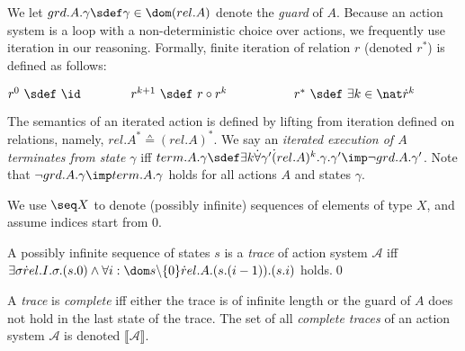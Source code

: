 \documentclass[11pt]{llncs}
\def \endbox{\hfill \qed}
\def \bs{\backslash}
\newcommand{\beh}[1]{\llbracket #1 \rrbracket}
\def \all  {\forall}
\newcommand{\msA}{\mathscr{A}}
\begin{document}
We let $grd.A.\gamma \sdef \gamma \in \dom (rel.A)$ denote the
\emph{guard} of $A$.  Because an action system is a loop with a
non-deterministic choice over actions, we frequently use iteration in
our reasoning. Formally, finite iteration of relation $r$ (denoted
$r^*$) is defined as follows: \smallskip

\hfill
$r^0\ \sdef\ \id \qquad\qquad r^{k+1}\ \sdef \ r \circ r^k \ \
\qquad\qquad \ \ r^* \ \sdef \ \exists k \in \nat \dot
r^k$\hfill\smallskip

\noindent The semantics of an iterated action is defined by lifting
from iteration defined on relations, namely,
$rel.A^* \sdef (rel.A)^*$.  We say an \emph{iterated execution of $A$
  terminates from state $\gamma$} iff
$term.A.\gamma \sdef \exists k \dot \all \gamma' \dot
(rel.A)^k.\gamma.\gamma' \imp \neg grd.A.\gamma'$.
Note that $\neg grd.A.\gamma \imp term.A.\gamma$ holds for all actions
$A$ and states $\gamma$.

We use $\seq X$ to denote (possibly infinite) sequences of elements of
type $X$, and assume indices start from $0$.
\begin{definition}\sloppypar
  \label{def:act-sys-beh}
  A possibly infinite sequence of states $s$ is a \emph{trace} of
  action system $\msA$ iff $\exists \sigma \dot rel.I.\sigma.(s.0)
  \land \all i: \dom s \bs \{0\} \dot rel.A.(s.(i - 1)).(s.i)$
  holds.\endbox
\end{definition}\noindent
A \emph{trace} is \emph{complete} iff either the trace is of infinite
length or the guard of $A$ does not hold in the last state of the
trace. The set of all \emph{complete traces} of an action system
$\msA$ is denoted $\beh \msA$.
\end{document}
